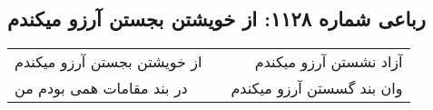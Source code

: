 \begin{center}
\section*{رباعی شماره ۱۱۲۸: از خویشتن بجستن آرزو میکندم}
\label{sec:1128}
\begin{longtable}{l p{0.5cm} r}
از خویشتن بجستن آرزو میکندم
&&
آزاد نشستن آرزو میکندم
\\
در بند مقامات همی بودم من
&&
وان بند گسستن آرزو میکندم
\\
\end{longtable}
\end{center}
